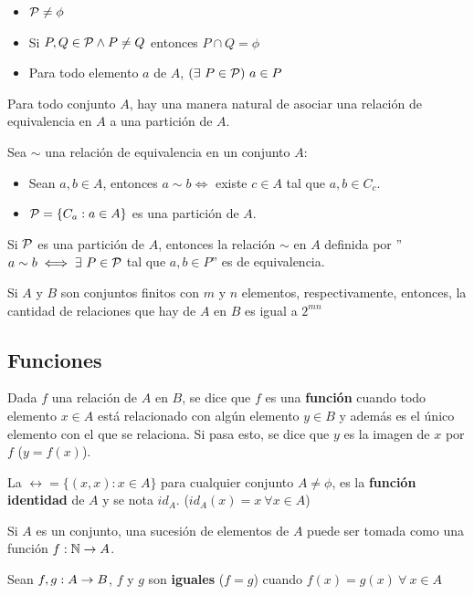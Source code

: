    \begin{itemize}
        \item $\mathcal{P}\neq\phi$
        \item Si $P, Q \in \mathcal{P} \land P\neq Q$ entonces $P\cap Q = \phi$
        \item Para todo elemento $a$ de $A$, $(\exists~ P\in\mathcal{P})~a\in P$
    \end{itemize}
    
    Para todo conjunto $A$, hay una manera natural de asociar una relación de equivalencia en $A$ a una partición de $A$. 
        
    Sea $\sim$ una relación de equivalencia en un conjunto $A$:
    
    \begin{itemize}
        \item Sean $a,b\in A$, entonces $a\sim b \iff$ existe $c\in A$ tal que $a,b\in C_c$.
        \item $\mathcal{P} = \{C_a : a\in A\}$ es una partición de $A$.
    \end{itemize} 
    
    Si $\mathcal{P}$ es una partición de $A$, entonces la relación $\sim$ en $A$ definida por ''$a\sim b \iff \exists~P\in\mathcal{P}$ tal que $a,b\in P$'' es de equivalencia.

    Si $A$ y $B$ son conjuntos finitos con $m$ y $n$ elementos, respectivamente, entonces, la cantidad de relaciones que hay de $A$ en $B$ es igual a $2^{mn}$    
    \subsection{Funciones}
    Dada $f$ una relación de $A$ en $B$, se dice que $f$ es una \textbf{función} cuando todo elemento $x\in A$ está relacionado con algún elemento $y\in B$ y además es el único elemento con el que se relaciona. Si pasa esto, se dice que $y$ es la imagen de $x$ por $f$ ($y=f(x)$).
    
    La $\rel = \{(x,x) : x\in A\}$ para cualquier conjunto $A\neq\phi$, es la \textbf{función identidad} de $A$ y se nota $id_A$.  ($id_A(x) = x ~\forall x\in A$)
    
    Si $A$ es un conjunto, una sucesión de elementos de $A$ puede ser tomada como una función $f:\mathbb{N}\to A$.
    
    Sean $f,g : A\rightarrow B$, $f$ y $g$ son \textbf{iguales} ($f=g$) cuando $f(x) = g(x)~\forall~x\in A$
    
